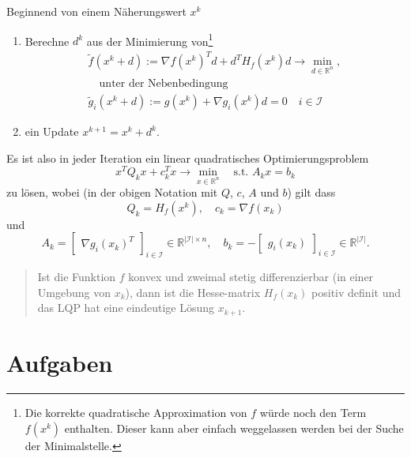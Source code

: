 \documentclass[]{book}
\providecommand{\tightlist}{%
  \setlength{\itemsep}{0pt}\setlength{\parskip}{0pt}}
\newenvironment {JHSAYS} [0] {\begin{quote}\color{jhsc}} {\end{quote}}
\theoremstyle{definition}
\theoremstyle{definition}
\theoremstyle{definition}
\theoremstyle{definition}
\theoremstyle{remark}
\begin{document}
Beginnend von einem Näherungswert \(x^k\)

\begin{enumerate}
\def\labelenumi{\arabic{enumi}.}
\tightlist
\item
  Berechne \(d^k\) aus der Minimierung von\footnote{Die korrekte quadratische Approximation von \(f\) würde noch den Term \(f(x^k)\) enthalten. Dieser kann aber einfach weggelassen werden bei der Suche der Minimalstelle.}
  \begin{align*}
  \tilde f(x^k+d):= \nabla f(x^k)^T d + d^TH_f(x^k) d \to \min_{d\in \mathbb R^{n}}, \\\quad \text{unter der Nebenbedingung} \\ \tilde g_i(x^k+d):=g(x^k)+\nabla g_i(x^k)d = 0 \quad i \in \mathcal I
    \end{align*}
\item
  ein Update \(x^{k+1}=x^k+d^k\).
\end{enumerate}

Es ist also in jeder Iteration ein linear quadratisches Optimierungsproblem
\begin{equation*}
x^T Q_k x + c_k^Tx  \to \min_{x\in \mathbb R^{n}} \quad \text{s.t. }A_kx=b_k
\end{equation*}
zu lösen, wobei (in der obigen Notation mit \(Q\), \(c\), \(A\) und \(b\)) gilt dass
\begin{equation*}
Q_k=H_f(x^k), \quad c_k=\nabla f(x_k)
\end{equation*}
und
\begin{equation*}
A_k = 
\begin{bmatrix}
\nabla g_i(x_k)^T
\end{bmatrix}_{i \in \mathcal I} \in \mathbb R^{|\mathcal I| \times n},
\quad 
b_k = -
\begin{bmatrix}
g_i(x_k) 
\end{bmatrix}_{i \in \mathcal I}\in \mathbb R^{|\mathcal I|}.
\end{equation*}

\leavevmode\hypertarget{rem-conv-hesse}{}%
\begin{JHSAYS}
Ist die Funktion \(f\) konvex und zweimal stetig differenzierbar (in einer Umgebung von \(x_k\)), dann ist die Hesse-matrix \(H_f(x_k)\) positiv definit und das LQP hat eine eindeutige Lösung \(x_{k+1}\).

\end{JHSAYS}

\hypertarget{aufgaben-5}{%
\section{Aufgaben}\label{aufgaben-5}}
\end{document}
